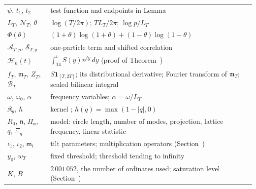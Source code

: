 \documentclass[preprint,12pt]{elsarticle}
\makeatletter
\let\CG@origref\ref
\let\CG@origeqref\eqref
\newcommand{\CG@gettip}[1]{\@ifundefined{CGTip@#1}{Reference: #1}{\csname CGTip@#1\endcsname}}
\DeclareRobustCommand{\CGref}[1]{\pdftooltip{\CG@origref{#1}}{\CG@gettip{#1}}}
\DeclareRobustCommand{\CGeqref}[1]{\pdftooltip{\CG@origeqref{#1}}{\CG@gettip{#1}}}
\numberwithin{equation}{section}
\theoremstyle{plain}
\theoremstyle{definition}
\theoremstyle{remark}
\makeatother
\begin{document}
\begin{center}
\begin{longtable}{p{}p{}}
$\psi$, $t_1$, $t_2$ & test function and endpoints in Lemma~\CGref{lem:first_moment_identity}\\
$L_T$, $\mathcal N_T$, $\theta$ & $\log(T/2\pi)$; $TL_T/2\pi$; $\log p/L_T$\\
$\Phi(\theta)$ & $(1+\theta)\log(1+\theta)+(1-\theta)\log(1-\theta)$\\
$\mathcal A_{T,p}$, $\mathcal S_{T,p}$ & one-particle term and shifted correlation \CGeqref{eq:ATp_STp}\\
$\mathcal H_n(t)$ & $\int_{14}^tS(y)n^{iy}\,dy$ (proof of Theorem~\CGref{thm:projection})\\
$f_T$, $\mathfrak m_T$, $Z_T$, $\mathcal B_T$ & $S\mathbf 1_{[T,2T]}$; its distributional derivative; Fourier transform of $\mathfrak m_T$; scaled bilinear integral \CGeqref{eq:BT_scaled}\\
$\omega$, $\omega_0$, $\alpha$ & frequency variables; $\alpha=\omega/L_T$\\
$\mathfrak K_\theta$, $h$ & kernel \CGeqref{eq:kernel_piecewise}; $h(q)=\max(1-|q|,0)$\\
$R_0$, $\mathfrak n$, $\Pi_{\mathfrak n}$, $q$, $\Xi_q$ & model: circle length, number of modes, projection, lattice frequency, linear statistic\\
$\iota_1$, $\iota_2$, $\mathsf m_i$ & tilt parameters; multiplication operators (Section~\CGref{subsec:det_model})\\
$y_0$, $w_T$ & fixed threshold; threshold tending to infinity\\
$K$, $B$ & $2\,001\,052$, the number of ordinates used; saturation level (Section~\CGref{subsec:one_step_cutoff})\\
\end{longtable}
\end{center}
\end{document}
